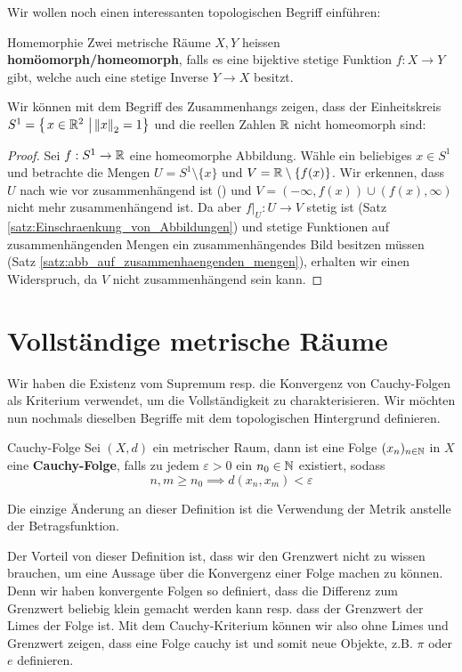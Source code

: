Wir wollen noch einen interessanten topologischen Begriff einführen:
\begin{definition}{Homemorphie}{}
Zwei metrische Räume $X,Y$ heissen \textbf{homöomorph/homeomorph}, falls es eine bijektive stetige Funktion $f: X \to Y$ gibt, welche auch eine stetige Inverse $Y \to X$ besitzt.
\end{definition}
\begin{example} Wir können mit dem Begriff des Zusammenhangs zeigen, dass der Einheitskreis $S^1=\left\{\left.x \in \mathbb{R}^2 \ \right| \left\|x\right\|_2 = 1 \right\}$ und die reellen Zahlen $\mathbb{R}$ nicht homeomorph sind:
\begin{proof}
Sei $f : S^1 \to \mathbb{R}$ eine homeomorphe Abbildung. Wähle ein beliebiges $x \in S^1$ und betrachte die Mengen $U = S^1 \setminus \{x\}$ und $V = \mathbb{R} \setminus \{f(x)\}$. Wir erkennen, dass $U$ nach wie vor zusammenhängend ist () und $V = (-\infty, f(x)) \cup (f(x), \infty)$ nicht mehr zusammenhängend ist. Da aber $f\vert_U: U \to V$ stetig ist (Satz \ref{satz:Einschraenkung_von_Abbildungen}) und stetige Funktionen auf zusammenhängenden Mengen ein zusammenhängendes Bild besitzen müssen (Satz \ref{satz:abb_auf_zusammenhaengenden_mengen}), erhalten wir einen Widerspruch, da $V$ nicht zusammenhängend sein kann.
\end{proof}
\end{example}

\section{Vollständige metrische Räume}
Wir haben die Existenz vom Supremum resp. die Konvergenz von Cauchy-Folgen als Kriterium verwendet, um die Vollständigkeit zu charakterisieren. Wir möchten nun nochmals dieselben Begriffe mit dem topologischen Hintergrund definieren.

\begin{definition}{Cauchy-Folge}{}
Sei $(X,d)$ ein metrischer Raum, dann ist eine Folge $(x_n)_{n \in \mathbb{N}}$ in $X$ eine \textbf{Cauchy-Folge}, falls zu jedem $\varepsilon >0$ ein $n_0 \in \mathbb{N}$ existiert, sodass
$$n,m \geq n_0 \implies d(x_n, x_m) < \varepsilon$$
\end{definition}
Die einzige Änderung an dieser Definition ist die Verwendung der Metrik anstelle der Betragsfunktion.

Der Vorteil von dieser Definition ist, dass wir den Grenzwert nicht zu wissen brauchen, um eine Aussage über die Konvergenz einer Folge machen zu können. Denn wir haben konvergente Folgen so definiert, dass die Differenz zum Grenzwert beliebig klein gemacht werden kann resp. dass der Grenzwert der Limes der Folge ist. Mit dem Cauchy-Kriterium können wir also ohne Limes und Grenzwert zeigen, dass eine Folge cauchy ist und somit neue Objekte, z.B. $\pi$ oder $e$ definieren.

